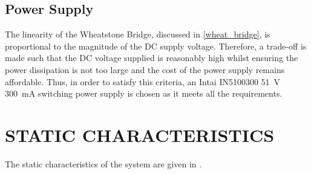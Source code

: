 \documentclass[10pt,twocolumn]{witseiepaper}
\begin{document}
\subsection{Power Supply} 

The linearity of the Wheatstone Bridge, discussed in \cref{wheat_bridge}, is proportional to the magnitude of the DC supply voltage. Therefore, a trade-off is made such that the DC voltage supplied is reasonably high whilst ensuring the power dissipation is not too large and the cost of the power supply remains affordable. Thus, in order to satisfy this criteria, an Intai IN5100300 51~V 300~mA switching power supply \cite{psu} is chosen as it meets all the requirements.

\section{STATIC CHARACTERISTICS}

The static characteristics of the system are given in .
\end{document}
